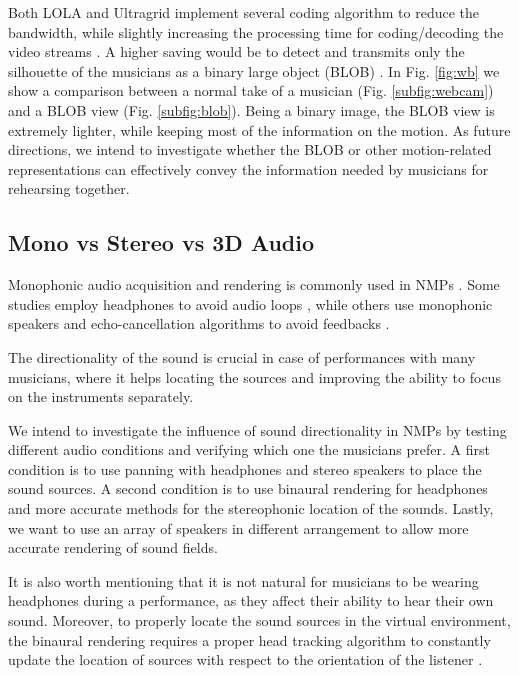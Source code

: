 Both LOLA and Ultragrid implement several coding algorithm to reduce the bandwidth, while slightly increasing the processing time for coding/decoding the video streams \cite{drioli2013networked,holub2006high}. A higher saving would be to detect and transmits only the silhouette of the musicians as a binary large object (BLOB) \cite{camurri2010visual}. In Fig. \ref{fig:wb} we show a comparison between a normal take of a musician (Fig. \ref{subfig:webcam}) and a BLOB view (Fig. \ref{subfig:blob}).
Being a binary image, the BLOB view is extremely lighter, while keeping most of the information on the motion. As future directions, we intend to investigate whether the BLOB or other motion-related representations can effectively convey the information needed by musicians for rehearsing together. 


\subsection{Mono vs Stereo vs 3D Audio}
Monophonic audio acquisition and rendering is commonly used in NMPs \cite{CIM2018}. Some studies employ headphones to avoid audio loops \cite{RottondiFeature}, while others use monophonic speakers and echo-cancellation algorithms to avoid feedbacks \cite{drioli2013networked}. 

The directionality of the sound is crucial %
in case of performances with many musicians, where it helps locating the sources and improving the ability to focus on the instruments separately. 

We intend to investigate the influence of sound directionality in NMPs by testing different audio conditions and verifying which one the musicians prefer. A first condition is to use panning with headphones and stereo speakers to place the sound sources. A second condition is to use binaural rendering for headphones and more accurate methods for the stereophonic location of the sounds. Lastly, we want to use an array of speakers in different arrangement to allow more accurate rendering of sound fields. 

It is also worth mentioning that it is not natural for musicians to be wearing headphones during a performance, as they affect their ability to hear their own sound. Moreover, to properly locate the sound sources in the virtual environment, the binaural rendering requires a proper head tracking algorithm to constantly update the location of sources with respect to the orientation of the listener \cite{Bonacina2016}.

